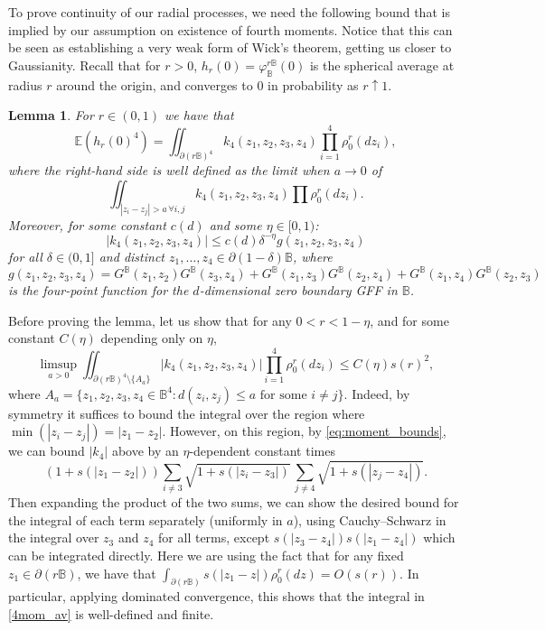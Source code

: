 \documentclass[10pt]{amsart}
\newtheorem{lemma}[theorem]{Lemma}
\theoremstyle{definition}
\newcommand{\E}{\mathbb{E}}
\newcommand{\B}{\mathbb{B}}\let\D\B\let\Ub\B
\begin{document}
To prove continuity of our radial processes, we need the following bound that is implied by our assumption on existence of fourth moments. Notice that this can be seen as establishing a very weak form of Wick's theorem, \ie getting us closer to Gaussianity. Recall that for $r>0$, $h_r(0)=\varphi_\B^{r \B}(0)$ is the spherical average at radius $r$ around the origin, and converges to $0$ in probability as $r\uparrow 1$.
\begin{lemma}\label{lem:4mtbnd}
For $r\in (0,1)$ we have that
\begin{equation}\label{4mom_av}
\E(h_r(0)^4)=\iint_{\partial(r\B)^4} k_4(z_1,z_2,z_3,z_4) \prod_{i=1}^4 \rho_0^r(dz_i),
\end{equation}
where the right-hand side is well defined as the limit when $a\to 0$ of
\[
\iint_{|z_i-z_j|>a \, \forall i,j} k_4(z_1,z_2,z_3,z_4) \prod \rho_0^r(dz_i).
\]
Moreover, for some constant $c(d)$ and some $\eta\in[0,1)$:
\begin{equation}\label{K4bound} |k_4(z_1,z_2,z_3,z_4)|\le c(d) \delta^{-\eta} g(z_1,z_2,z_3,z_4)\end{equation} for all $\delta\in (0,1]$ and distinct $z_1,\dots, z_4 \in \partial (1-\delta)\B$, where
\[
g(z_1,z_2,z_3,z_4)= G^\B(z_1,z_2)G^\B(z_3,z_4)+G^\B(z_1,z_3)G^\B(z_2,z_4)+G^\B(z_1,z_4)G^\B(z_2,z_3)
\]
{is the four-point function for the $d$-dimensional zero boundary GFF in $\B$.}
\end{lemma}

Before proving the lemma, let us show that for any {$0<r<1-\eta$}, and for some constant $C(\eta)$ depending only on $\eta$,
\begin{equation}\label{eq:k4sphere_crude}
\limsup_{a>0}\iint_{\partial(r\B)^4\setminus\{A_a\}} |k_4(z_1,z_2,z_3,z_4)| \prod_{i=1}^4 \rho_0^r(dz_i) \le C(\eta) s(r)^2,
\end{equation}
where $A_a=\{z_1,z_2,z_3,z_4\in \B^4: d(z_i,z_j)\le a \text{ for some } i\ne j\}$.
Indeed, by symmetry it suffices to bound the integral over the region where $\min(|z_i-z_j|)=|z_1-z_2|$. However, on this region, by \eqref{eq:moment_bounds}, we can bound $|k_4|$ above by an $\eta$-dependent constant times
\[
(1+s(|z_1-z_2|))\sum_{i\ne 3} \sqrt{1+s(|z_i-z_3|)}\, \sum_{j\ne 4} \sqrt{1+s(|z_j-z_4|)}.
\]
Then expanding the product of the two sums, we can show the desired bound for the integral of each term separately (uniformly in $a$), using Cauchy--Schwarz in the integral over $z_3$ and $z_4$ for all terms, except $s(|z_3-z_4|)s(|z_1-z_4|)$ which can be integrated directly. Here we are using the fact that for any fixed $z_1\in \partial (r\B)$, we have that $\int_{\partial (r\B)} s(|z_1-z|){\rho_0^r(dz)}=O(s(r))$.
In particular, applying dominated convergence, this shows that the integral in \eqref{4mom_av} is well-defined and finite.
\end{document}
